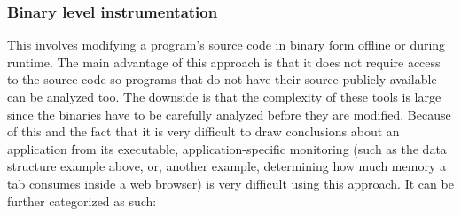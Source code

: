 \subsubsection{Binary level instrumentation}
This involves modifying a program's source code in binary form offline or during runtime. The main advantage of this approach is that it does not require access to the source code so programs that do not have their source publicly available can be analyzed too. The downside is that the complexity of these tools is large since the binaries have to be carefully analyzed before they are modified. Because of this and the fact that it is very difficult to draw conclusions about an application from its executable, application-specific monitoring (such as the data structure example above, or, another example, determining how much memory a tab consumes inside a web browser) is very difficult using this approach. It can be further categorized as such:

